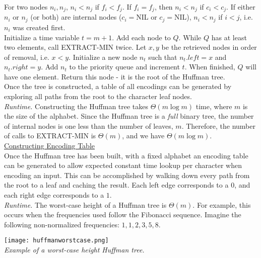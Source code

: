 \documentclass[12pt, fleqn]{general}
\begin{document}
\begin{multicols*}{2}
    For two nodes $n_i, n_j$, $n_i < n_j$ if $f_i < f_j$. If $f_i = f_j$, then $n_i < n_j$ if $c_i < c_j$. If either $n_i$ or $n_j$ (or both) are internal nodes ($c_i = $NIL or $c_j = $NIL), $n_i < n_j$ if $i < j$, i.e. $n_i$ was created first.\\

    Initialize a time variable $t = m+1$. Add each node to $Q$. While $Q$ has at least two elements, call EXTRACT-MIN twice. Let $x, y$ be the retrieved nodes in order of removal, i.e. $x < y$. Initialize a new node $n_t$ such that $n_t.left = x$ and $n_t.right = y$. Add $n_t$ to the priority queue and increment $t$. When finished, $Q$ will have one element. Return this node - it is the root of the Huffman tree.\\

    Once the tree is constructed, a table of all encodings can be generated by exploring all paths from the root to the character leaf nodes.\\

    \emph{Runtime.} Constructing the Huffman tree takes $\Theta(m\log m)$ time, where $m$ is the size of the alphabet. Since the Huffman tree is a \emph{full} binary tree, the number of internal nodes is one less than the number of leaves, $m$. Therefore, the number of calls to EXTRACT-MIN is $\Theta(m)$, and we have $\Theta(m\log m)$.\\

    \underline{Constructing Encoding Table}\\

    Once the Huffman tree has been built, with a fixed alphabet an encoding table can be generated to allow expected constant time lookup per character when encoding an input. This can be accomplished by walking down every path from the root to a leaf and caching the result. Each left edge corresponds to a $0$, and each right edge corresponds to a $1$.\\

    \emph{Runtime.} The worst-case height of a Huffman tree is $\Theta(m)$. For example, this occurs when the frequencies used follow the Fibonacci sequence. Imagine the following non-normalized frequencies: $1, 1, 2, 3, 5, 8$.

    \begin{center}
    \texttt{[image: huffmanworstcase.png]}\\
    \emph{Example of a worst-case height Huffman tree.}
    \end{center}


\end{multicols*}
\end{document}

